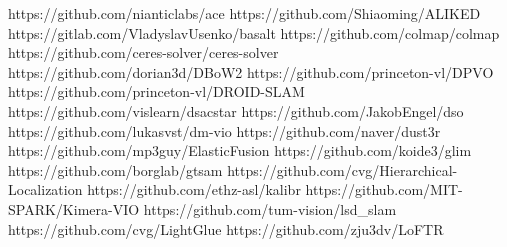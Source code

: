 \newcommand{\term}[1]{\textbf{#1}}                 %
\newcommand{\eng}[1]{\emph{#1}}                    %
\newcommand{\vn}[2]{\textbf{#1} (\emph{#2})}
\newcommand{\en}[1]{\textbf{\emph{#1}}}
\newcommand{\code}[1]{\texttt{#1}}
\usepackage{xstring}
\expandafter\def\csname repourl@ACE\endcsname{https://github.com/nianticlabs/ace}
\expandafter\def\csname repourl@ALIKED\endcsname{https://github.com/Shiaoming/ALIKED}
\expandafter\def\csname repourl@Basalt\endcsname{https://gitlab.com/VladyslavUsenko/basalt}
\expandafter\def\csname repourl@COLMAP\endcsname{https://github.com/colmap/colmap}
\expandafter\def\csname repourl@Ceres\endcsname{https://github.com/ceres-solver/ceres-solver}
\expandafter\def\csname repourl@DBoW2\endcsname{https://github.com/dorian3d/DBoW2}
\expandafter\def\csname repourl@DPVO\endcsname{https://github.com/princeton-vl/DPVO}
\expandafter\def\csname repourl@DROID-SLAM\endcsname{https://github.com/princeton-vl/DROID-SLAM}
\expandafter\def\csname repourl@DSAC*\endcsname{https://github.com/vislearn/dsacstar}
\expandafter\def\csname repourl@DSO\endcsname{https://github.com/JakobEngel/dso}
\expandafter\def\csname repourl@DM-VIO\endcsname{https://github.com/lukasvst/dm-vio}
\expandafter\def\csname repourl@DUSt3R\endcsname{https://github.com/naver/dust3r}
\expandafter\def\csname repourl@ElasticFusion\endcsname{https://github.com/mp3guy/ElasticFusion}
\expandafter\def\csname repourl@GLIM\endcsname{https://github.com/koide3/glim}
\expandafter\def\csname repourl@GTSAM\endcsname{https://github.com/borglab/gtsam}
\expandafter\def\csname repourl@HLoc\endcsname{https://github.com/cvg/Hierarchical-Localization}
\expandafter\def\csname repourl@Kalibr\endcsname{https://github.com/ethz-asl/kalibr}
\expandafter\def\csname repourl@Kimera\endcsname{https://github.com/MIT-SPARK/Kimera-VIO}
\expandafter\def\csname repourl@LSD-SLAM\endcsname{https://github.com/tum-vision/lsd_slam}
\expandafter\def\csname repourl@LightGlue\endcsname{https://github.com/cvg/LightGlue}
\expandafter\def\csname repourl@LoFTR\endcsname{https://github.com/zju3dv/LoFTR}
